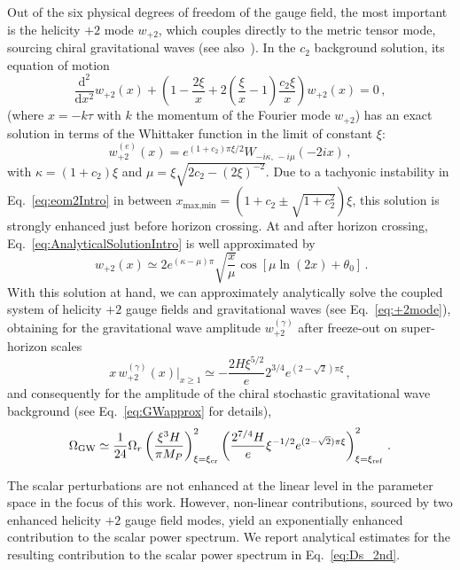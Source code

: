 Out of the six physical degrees of freedom of the gauge field, the most important is the helicity $+2$ mode $w_{+2}$, which couples directly to the metric tensor mode, sourcing chiral gravitational waves (see also~\cite{Dimastrogiovanni:2012ew,Adshead:2013qp}). In the $c_2$ background solution, its equation of motion 
\begin{equation}
 \frac{\textrm{d}^2}{ \textrm{d} x^2} w_{+2}(x) + \left(1 - \frac{2 \xi}{x} + 2 \left(\frac{\xi}{x} - 1 \right) \frac{c_2 \xi}{x} \right) w_{+2}(x) = 0 \,,
 \label{eq:eom2Intro}
\end{equation}
(where $x = - k \tau$ with $k$ the momentum of the Fourier mode $w_{+2}$) has an exact solution in terms of the Whittaker function in the limit of constant $\xi$:
\begin{equation}
w_{+2}^{(e)}(x)=e^{(1+c_{2})\pi\xi/2}W_{-i \kappa,\,-i\mu}\left(-2ix\right) \,,
\label{eq:AnalyticalSolutionIntro}
\end{equation}
with $\kappa = (1 + c_2) \xi$ and  $\mu = \xi \sqrt{2 c_2 - (2 \xi)^{-2}}$. Due to a tachyonic instability in Eq.~\eqref{eq:eom2Intro} in between $x_\text{max,min} = (1 + c_2 \pm \sqrt{1 + c_2^2})\xi$, this solution is strongly enhanced just before horizon crossing. At and after horizon crossing, Eq.~\eqref{eq:AnalyticalSolutionIntro} is well approximated by
\begin{equation}
  \, w_{+2}(x) \simeq 2 e^{(\kappa - \mu) \pi} \sqrt{\frac{ x}{ \mu}} \cos\left[\mu \ln(2 x) + \theta_0 \right] \,.
\end{equation}
With this solution at hand, we can approximately analytically solve the 
coupled system of helicity $+2$ gauge fields and gravitational waves 
(see Eq.~\eqref{eq:+2mode}), obtaining for the gravitational wave amplitude $w_{+2}^{(\gamma)}$ after freeze-out on super-horizon scales
\begin{equation}
 x \, w_{+2}^{(\gamma)}(x) \big|_{x \geq 1} \simeq -  \frac{2 H \xi^{5/2}}{e } 2^{3/4} e^{(2 - \sqrt{2}) \pi \xi} \,,
\end{equation}
and consequently for the amplitude of the chiral stochastic gravitational wave background (see Eq.~\eqref{eq:GWapprox} for details),
\begin{equation}
 \Omega_{\rm GW} \simeq \frac{1}{24} \Omega_r \left( \frac{\xi^3 H}{\pi M_P} \right)^2_{\xi = \xi_\text{cr}}  \left( \frac{2^{7/4} H}{e} \xi^{-1/2} e^{(2 - \sqrt{2}) \pi \xi}  \right)^2_{\xi = \xi_\text{ref}} \,.
\end{equation}

The scalar perturbations are not enhanced at the linear level in the parameter space in the focus of this work. However, non-linear contributions, sourced by two enhanced helicity $+2$ gauge field modes, yield an exponentially enhanced contribution to the scalar power spectrum. We report analytical estimates for the resulting contribution to the scalar power spectrum in Eq.~\eqref{eq:Ds_2nd}. 

